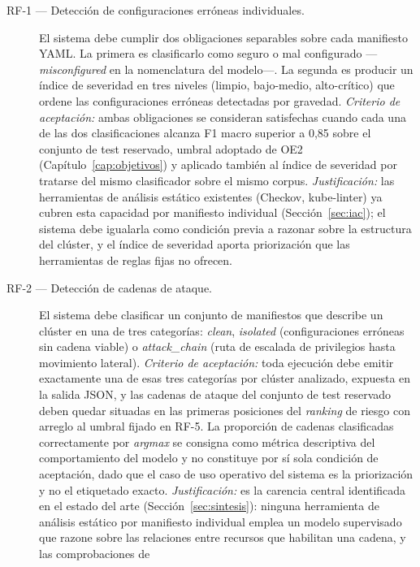 \begin{description}
  \item[RF-1 — Detección de configuraciones erróneas individuales.] El sistema debe cumplir
    dos obligaciones separables sobre cada manifiesto \acs{YAML}. La primera es
    clasificarlo como seguro o mal configurado —\textit{misconfigured} en la
    nomenclatura del modelo\mbox{—.} La segunda es producir un
    índice de severidad en tres niveles (limpio, bajo-medio, alto-crítico)
    que ordene las configuraciones erróneas detectadas por gravedad.
    \textit{Criterio de aceptación:} ambas obligaciones se consideran satisfechas
    cuando cada una de las dos clasificaciones alcanza F1 macro superior a 0,85
    sobre el conjunto de test reservado, umbral adoptado de OE2
    (Capítulo~\ref{cap:objetivos}) y aplicado también al índice de severidad por
    tratarse del mismo clasificador sobre el mismo corpus.
    \textit{Justificación:} las herramientas de análisis estático existentes
    (Checkov, kube-linter) ya cubren esta capacidad por
    manifiesto individual (Sección~\ref{sec:iac}); el sistema debe igualarla como
    condición previa a razonar sobre la estructura del clúster, y el índice de
    severidad aporta priorización que las herramientas de reglas fijas no ofrecen.
  \item[RF-2 — Detección de cadenas de ataque.] El sistema debe clasificar un conjunto
    de manifiestos que describe un clúster en una de tres categorías: \textit{clean},
    \textit{isolated} (configuraciones erróneas sin cadena viable) o
    \textit{attack\_chain} (ruta de escalada de privilegios hasta movimiento lateral).
    \textit{Criterio de aceptación:} toda ejecución debe emitir exactamente una de
    esas tres categorías por clúster analizado, expuesta en la salida \acs{JSON}, y
    las cadenas de ataque del conjunto de test reservado deben quedar situadas en
    las primeras posiciones del \textit{ranking} de riesgo con arreglo al umbral
    fijado en RF-5. La proporción de cadenas clasificadas correctamente por
    \textit{argmax} se consigna como métrica descriptiva del comportamiento del
    modelo y no constituye por sí sola condición de aceptación, dado que el caso
    de uso operativo del sistema es la priorización y no el etiquetado exacto.
    \textit{Justificación:} es la carencia central identificada en el estado del arte
    (Sección~\ref{sec:sintesis}): ninguna herramienta de análisis estático por
    manifiesto individual emplea un modelo supervisado que razone sobre las
    relaciones entre recursos que habilitan una cadena, y las comprobaciones de

\end{description}
